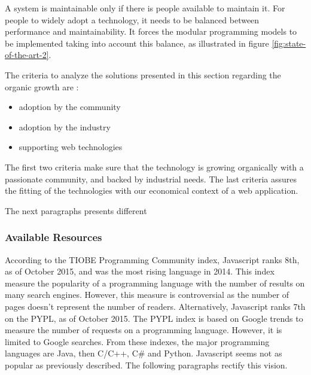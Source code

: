 A system is maintainable only if there is people available to maintain it.
For people to widely adopt a technology, it needs to be balanced between performance and maintainability.
It forces the modular programming models to be implemented taking into account this balance, as illustrated in figure \ref{fig:state-of-the-art-2}.



The criteria to analyze the solutions presented in this section regarding the organic growth are : 
\begin{itemize}
\item adoption by the community
\item adoption by the industry
\item supporting web technologies
\end{itemize}
The first two criteria make sure that the technology is growing organically with a passionate community, and backed by industrial needs.
The last criteria assures the fitting of the technologies with our economical context of a web application. 

The next paragraphs presents different 


\subsubsection{Available Resources}

According to the TIOBE Programming Community index, Javascript ranks 8th, as of October 2015, and was the most rising language in 2014.
This index measure the popularity of a programming language with the number of results on many search engines.
However, this measure is controversial as the number of pages doesn't represent the number of readers.
Alternatively, Javascript ranks 7th on the PYPL, as of October 2015.
The PYPL index is based on Google trends to measure the number of requests on a programming language.
However, it is limited to Google searches.
From these indexes, the major programming languages are Java, then C/C++, C\# and Python.
Javascript seems not as popular as previously described.
The following paragraphs rectify this vision.

